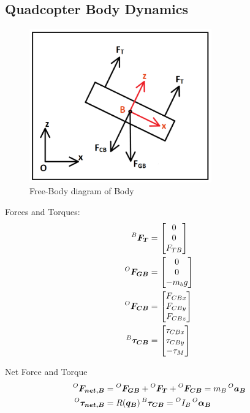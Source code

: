\subsection{Quadcopter Body Dynamics}
\begin{figure}[H]
\centering
\includegraphics[width=0.7\textwidth]{./Wilson_img/B_mm.png}
\caption{Free-Body diagram of Body}
\end{figure}
Forces and Torques:
\begin{align*}
  \prescript{B}{}{\bm{F_{T}}} &=
  \begin{bmatrix}
    0 \\ 0 \\ F_{TB}
  \end{bmatrix} \\
  \prescript{O}{}{\bm{F_{GB}}} &=
  \begin{bmatrix}
    0 \\ 0 \\ -m_b g
  \end{bmatrix} \\
  \prescript{O}{}{\bm{F_{CB}}} &=
  \begin{bmatrix}
    F_{CBx} \\ F_{CBy} \\ F_{CBz} 
  \end{bmatrix} \\
  \prescript{B}{}{\bm{\tau_{CB}}} &=
  \begin{bmatrix}
    \tau_{CBx} \\ \tau_{CBy} \\ -\tau_{M} 
  \end{bmatrix}
\end{align*}

Net Force and Torque
\begin{align}
  \prescript{O}{}{\bm{F_{net,B}}} &= \prescript{O}{}{\bm{F_{GB}}} + \prescript{O}{}{\bm{F_{T}}} + \prescript{O}{}{\bm{F_{CB}}} = m_B \prescript{O}{}{\bm{a_B}} \\
  \prescript{O}{}{\bm{\tau_{net,B}}} &= R(\bm{q_B})\prescript{B}{}{\bm{\tau_{CB}}} = \prescript{O}{}{I_B} \prescript{O}{}{\bm{\alpha_B}}
\end{align}

